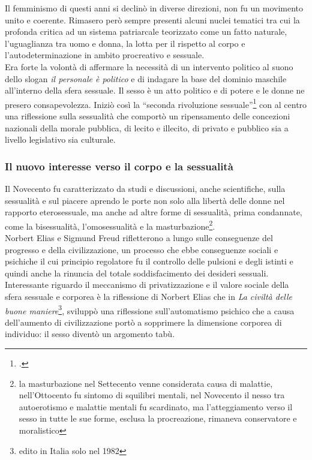 Il femminismo di questi anni si declinò in diverse direzioni, non fu un movimento unito e coerente.
Rimasero però sempre presenti alcuni nuclei tematici tra cui la profonda critica ad un sistema patriarcale teorizzato come un fatto naturale, l'uguaglianza tra uomo e donna, la lotta per il rispetto al corpo e l'autodeterminazione in ambito procreativo e sessuale.
\\Era forte la volontà di affermare la necessità di un intervento politico al suono dello slogan \textit{il personale è politico} e di indagare la base del dominio maschile all'interno della sfera sessuale.
Il sesso è un atto politico e di potere e le donne ne presero consapevolezza.
Iniziò così la \enquote{seconda rivoluzione sessuale}\footcite{Balestracci} con al centro una riflessione sulla sessualità che comportò un ripensamento delle concezioni nazionali della morale pubblica, di lecito e illecito, di privato e pubblico sia a livello legislativo sia culturale.


\subsubsection{Il nuovo interesse verso il corpo e la sessualità}
Il Novecento fu caratterizzato da studi e discussioni, anche scientifiche, sulla sessualità e sul piacere aprendo le porte non solo alla libertà delle donne nel rapporto eterosessuale, ma anche ad altre forme di sessualità, prima condannate, come la bisessualità, l'omosessualità e la masturbazione\footnote{la masturbazione nel Settecento venne considerata causa di malattie, nell'Ottocento fu sintomo di squilibri mentali, nel Novecento il nesso tra autoerotismo e malattie mentali fu scardinato, ma l'atteggiamento verso il sesso in tutte le sue forme, esclusa la procreazione, rimaneva conservatore e moralistico}.
\\Norbert Elias e Sigmund Freud rifletterono a lungo sulle conseguenze del progresso e della civilizzazione, un processo che ebbe conseguenze sociali e psichiche il cui principio regolatore fu il controllo delle pulsioni e degli istinti e quindi anche la rinuncia del totale soddisfacimento dei desideri sessuali.
Interessante riguardo il meccanismo di privatizzazione e il valore sociale della sfera sessuale e corporea è la riflessione di Norbert Elias che in \textit{La civiltà delle buone maniere}\footnote{edito in Italia solo nel 1982}, sviluppò una riflessione sull'automatismo psichico che a causa dell'aumento di civilizzazione portò a sopprimere la dimensione corporea di individuo: il sesso diventò un argomento tabù. 

